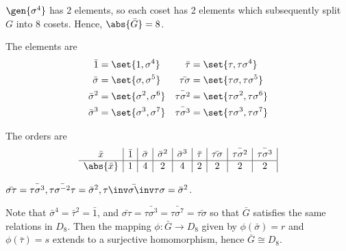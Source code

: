 \begin{solenum}
    \item $\gen{\sigma^4}$ has 2 elements, so each coset has 2 elements which subsequently split $G$ into 8 cosets.
	Hence, $\abs{\bar G} = 8$.
    \item The elements are
    \begin{align*}
        \bar 1 & = \set{1, \sigma^4} & \bar\tau & = \set{\tau, \tau\sigma^4} \\
        \bar\sigma & = \set{\sigma, \sigma^5} & \bar{\tau\sigma} & = \set{\tau\sigma, \tau\sigma^5} \\
        \bar\sigma^2 & = \set{\sigma^2, \sigma^6} & \bar{\tau\sigma^2} & = \set{\tau\sigma^2, \tau\sigma^6} \\
        \bar\sigma^3 & = \set{\sigma^3, \sigma^7} & \bar{\tau\sigma^3} & = \set{\tau\sigma^3, \tau\sigma^7}
    \end{align*}
    \item The orders are
    \[
        \begin{array}{*{9}{c|}}
            \bar x & \bar 1 & \bar\sigma & \bar\sigma^2 & \bar\sigma^3 & \bar\tau & \bar{\tau\sigma} & \bar{\tau\sigma^2} & \bar{\tau\sigma^3} \\
            \hline
            \abs{\bar x} & 1 & 4 & 2 & 4 & 2 & 2 & 2 & 2
        \end{array}
    \]
    \item $\bar{\sigma\tau} = \bar{\tau\sigma^3}, \bar{\tau\sigma^{-2}\tau} = \bar\sigma^2, \bar{\tau\inv\sigma\inv\tau\sigma} = \bar\sigma^2$.
    \item Note that $\bar\sigma^4 = \bar\tau^2 = \bar 1$, and $\bar{\sigma\tau} = \bar{\tau\sigma^3} = \bar{\tau\sigma^7} = \bar{\tau\sigma}$ so that $\bar G$ satisfies the same relations in $D_8$.
	Then the mapping $\phi \colon \bar G \to D_8$ given by $\phi(\bar\sigma) = r$ and $\phi(\bar\tau) = s$ extends to a surjective homomorphism, hence $\bar G \cong D_8$.
\end{solenum}

